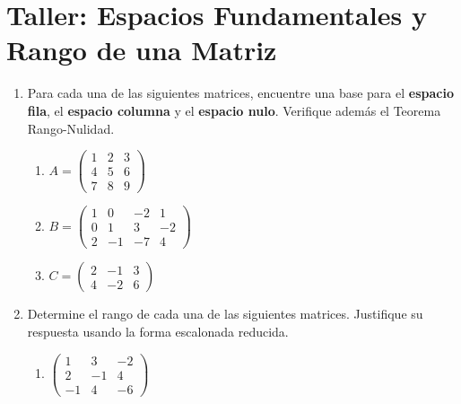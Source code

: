 \documentclass[12pt,letterpaper]{article}
\begin{document}
\section*{Taller: Espacios Fundamentales y Rango de una Matriz}

\begin{enumerate}


    \item Para cada una de las siguientes matrices, encuentre una base para el \textbf{espacio fila}, el \textbf{espacio columna} y el \textbf{espacio nulo}. Verifique además el Teorema Rango-Nulidad.

    \begin{enumerate}
        \item $A = \begin{pmatrix} 1 & 2 & 3 \\ 4 & 5 & 6 \\ 7 & 8 & 9 \end{pmatrix}$

        \item $B = \begin{pmatrix} 1 & 0 & -2 & 1 \\ 0 & 1 & 3 & -2 \\ 2 & -1 & -7 & 4 \end{pmatrix}$

        \item $C = \begin{pmatrix} 2 & -1 & 3 \\ 4 & -2 & 6 \end{pmatrix}$
    \end{enumerate}


    \item Determine el rango de cada una de las siguientes matrices. Justifique su respuesta usando la forma escalonada reducida.

    \begin{enumerate}
        \item $\begin{pmatrix} 1 & 3 & -2 \\ 2 & -1 & 4 \\ -1 & 4 & -6 \end{pmatrix}$


\end{enumerate}
\end{enumerate}
\end{document}
